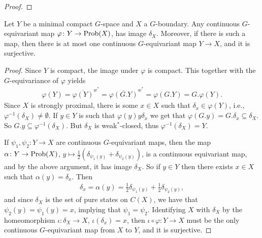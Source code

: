 \begin{proposition}
\begin{proof}
%
\end{proof}
\end{proposition}
%
%

\begin{proposition}\label{unique surjective x' x}
Let $Y$ be a minimal compact $G$-space and $X$ a $G$-boundary. Any continuous $G$-equivariant map $\varphi \colon Y \to \operatorname{Prob}(X)$, has image $\delta_{X}$. Moreover, if there is such a map, then there is at most one continuous $G$-equivariant map $Y \to X$, and it is surjective.
\begin{proof}
Since $Y$ is compact, the image under $\varphi$ is compact. This together with the $G$-equivariance of $\varphi$ yields
\begin{align*}
\varphi(Y)=\overline{\varphi(Y)}^{w^*}=\overline{\varphi(G.Y)}^{w^*}=\varphi(G.Y)=G.\varphi(Y).
\end{align*}
Since $X$ is strongly proximal, there is some $x \in X$ such that $\delta_{x} \in \varphi(Y)$, i.e., $\varphi^{-1}(\delta_{X}) \neq \emptyset$. If $y \in Y$ is such that $\varphi(y)y\delta_{x}$ we get that $\varphi(G.y)= G.\delta_{x} \subseteq \delta_{X}$. So $G.y \subseteq \varphi^{-1}(\delta_{X})$. But $\delta_{X}$ is weak$^*$-closed, thus $\varphi^{-1}(\delta_{X})=Y$. 

\noindent If  $\psi_1,\psi_2 \colon Y \to X$ are continuous $G$-equivariant maps, then the map $\alpha \colon Y \to \operatorname{Prob}(X) $, $y \mapsto \frac{1}{2}(\delta_{\psi_1(y)}+\delta_{\psi_2(y)})$, is a continuous equivariant map, and by the above argument, it has image $\delta_{X}$. So if $y \in Y$ then there exists $x \in X$ such that $\alpha(y)= \delta_x$. Then
\begin{align*}
\delta_x=\alpha(y)=\frac12 \delta_{\psi_1(y)}+ \frac12 \delta_{\psi_2(y)},
\end{align*}
and since $\delta_X$ is the set of pure states on $C(X)$, we have that $\psi_2(y)=\psi_1(y)=x$, implying that $\psi_1=\psi_2$. Identifying $X$ with $\delta_X$ by the homeomorphism $\iota \colon \delta_X \to X$, $\iota(\delta_x)=x$, then $\iota \circ \varphi \colon Y \to X$ must be the only continuous $G$-equivariant map from $X$ to $Y$, and it is surjective.
\end{proof}
\end{proposition}

